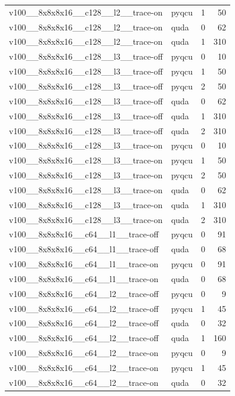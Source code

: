 \begin{table}[htbp]
\begin{tabular}{@{}llrr@{}}
v100\_\_8x8x8x16\_\_c128\_\_l2\_\_trace-on & pyqcu & 1 & 50 \\
v100\_\_8x8x8x16\_\_c128\_\_l2\_\_trace-on & quda & 0 & 62 \\
v100\_\_8x8x8x16\_\_c128\_\_l2\_\_trace-on & quda & 1 & 310 \\
v100\_\_8x8x8x16\_\_c128\_\_l3\_\_trace-off & pyqcu & 0 & 10 \\
v100\_\_8x8x8x16\_\_c128\_\_l3\_\_trace-off & pyqcu & 1 & 50 \\
v100\_\_8x8x8x16\_\_c128\_\_l3\_\_trace-off & pyqcu & 2 & 50 \\
v100\_\_8x8x8x16\_\_c128\_\_l3\_\_trace-off & quda & 0 & 62 \\
v100\_\_8x8x8x16\_\_c128\_\_l3\_\_trace-off & quda & 1 & 310 \\
v100\_\_8x8x8x16\_\_c128\_\_l3\_\_trace-off & quda & 2 & 310 \\
v100\_\_8x8x8x16\_\_c128\_\_l3\_\_trace-on & pyqcu & 0 & 10 \\
v100\_\_8x8x8x16\_\_c128\_\_l3\_\_trace-on & pyqcu & 1 & 50 \\
v100\_\_8x8x8x16\_\_c128\_\_l3\_\_trace-on & pyqcu & 2 & 50 \\
v100\_\_8x8x8x16\_\_c128\_\_l3\_\_trace-on & quda & 0 & 62 \\
v100\_\_8x8x8x16\_\_c128\_\_l3\_\_trace-on & quda & 1 & 310 \\
v100\_\_8x8x8x16\_\_c128\_\_l3\_\_trace-on & quda & 2 & 310 \\
v100\_\_8x8x8x16\_\_c64\_\_l1\_\_trace-off & pyqcu & 0 & 91 \\
v100\_\_8x8x8x16\_\_c64\_\_l1\_\_trace-off & quda & 0 & 68 \\
v100\_\_8x8x8x16\_\_c64\_\_l1\_\_trace-on & pyqcu & 0 & 91 \\
v100\_\_8x8x8x16\_\_c64\_\_l1\_\_trace-on & quda & 0 & 68 \\
v100\_\_8x8x8x16\_\_c64\_\_l2\_\_trace-off & pyqcu & 0 & 9 \\
v100\_\_8x8x8x16\_\_c64\_\_l2\_\_trace-off & pyqcu & 1 & 45 \\
v100\_\_8x8x8x16\_\_c64\_\_l2\_\_trace-off & quda & 0 & 32 \\
v100\_\_8x8x8x16\_\_c64\_\_l2\_\_trace-off & quda & 1 & 160 \\
v100\_\_8x8x8x16\_\_c64\_\_l2\_\_trace-on & pyqcu & 0 & 9 \\
v100\_\_8x8x8x16\_\_c64\_\_l2\_\_trace-on & pyqcu & 1 & 45 \\
v100\_\_8x8x8x16\_\_c64\_\_l2\_\_trace-on & quda & 0 & 32 \\

\end{tabular}
\end{table}
